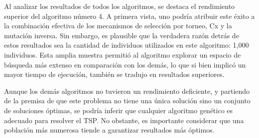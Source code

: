 Al analizar los resultados de todos los algoritmos, se destaca el rendimiento superior del algoritmo número 4. A primera vista, uno podría atribuir este éxito a la combinación efectiva de los mecanismos de selección por torneo, Cx y la mutación inversa. Sin embargo, es plausible que la verdadera razón detrás de estos resultados sea la cantidad de individuos utilizados en este algoritmo: 1,000 individuos. Esta amplia muestra permitió al algoritmo explorar un espacio de búsqueda más extenso en comparación con los demás, lo que si bien implicó un mayor tiempo de ejecución, también se tradujo en resultados superiores.

Aunque los demás algoritmos no tuvieron un rendimiento deficiente, y partiendo de la premisa de que este problema no tiene una única solución sino un conjunto de soluciones óptimas, se podría inferir que cualquier algoritmo genético es adecuado para resolver el TSP. No obstante, es importante considerar que una población más numerosa tiende a garantizar resultados más óptimos.
